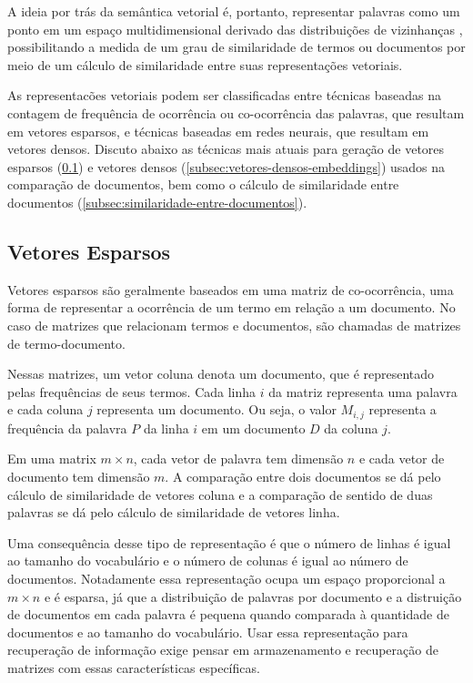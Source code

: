 \documentclass[
	12pt,				%
	openright,			%
	oneside,			%
	a4paper,			%
	english,			%
	french,				%
	spanish,			%
	brazil				%
	]{abntex2}
\begin{document}
A ideia por trás da semântica vetorial é, portanto, representar palavras como um ponto em um espaço multidimensional derivado das distribuições de vizinhanças \cite{JurafskyMartin2023},
possibilitando a medida de um grau de similaridade de termos ou documentos por meio de um cálculo de similaridade entre suas representações vetoriais.

As representacões vetoriais podem ser classificadas entre técnicas baseadas na contagem de frequência de ocorrência
ou co-ocorrência das palavras, que resultam em vetores esparsos, e técnicas baseadas em redes neurais, que resultam
em vetores densos.
Discuto abaixo as técnicas mais atuais para geração de vetores esparsos (\ref{subsec:vetores-esparsos}) e vetores densos (\ref{subsec:vetores-densos-embeddings})
usados na comparação de documentos, bem como o cálculo de similaridade entre documentos (\ref{subsec:similaridade-entre-documentos}).


\subsection{Vetores Esparsos}\label{subsec:vetores-esparsos}

Vetores esparsos são geralmente baseados em uma matriz de co-ocorrência, uma forma de representar a ocorrência de um
termo em relação a um documento.
No caso de matrizes que relacionam termos e documentos, são chamadas de matrizes de termo-documento.
\cite{JurafskyMartin2023}

Nessas matrizes, um vetor coluna denota um documento, que é representado pelas frequências de seus termos.
Cada linha $i$ da matriz representa uma palavra e cada coluna $j$ representa
um documento.
Ou seja, o valor $M_{i,j}$ representa a frequência da palavra $P$ da linha $i$ em um documento $D$ da coluna $j$.

Em uma matrix $m \times n$, cada vetor de palavra tem dimensão $n$ e cada vetor de documento tem dimensão $m$.
A comparação entre dois documentos se dá pelo cálculo de similaridade de vetores coluna e a
comparação de sentido de duas palavras se dá pelo cálculo de similaridade de vetores linha.

Uma consequência desse tipo de representação é que o número de linhas é igual ao tamanho do vocabulário e o número de colunas
é igual ao número de documentos.
Notadamente essa representação ocupa um espaço proporcional a $m \times n$ e é esparsa, já que a distribuição de palavras por documento e
a distruição de documentos em cada palavra é pequena quando comparada à quantidade de documentos e ao tamanho do vocabulário.
Usar essa representação para recuperação de informação exige pensar em armazenamento e recuperação de matrizes com essas
características específicas.
\cite{JurafskyMartin2023}
\end{document}
